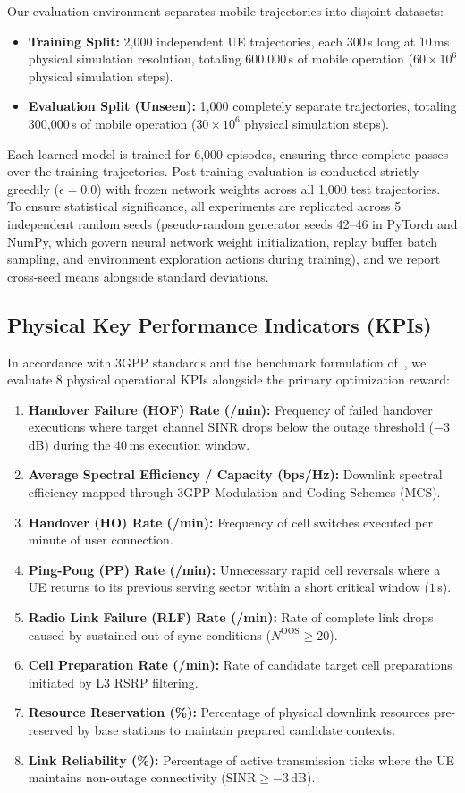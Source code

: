 \documentclass{ieeetmlcn}
\begin{document}
Our evaluation environment separates mobile trajectories into disjoint datasets:
\begin{itemize}
    \item \textbf{Training Split:} 2,000 independent UE trajectories, each 300\,s long at 10\,ms physical simulation resolution, totaling 600,000\,s of mobile operation ($60 \times 10^6$ physical simulation steps).
    \item \textbf{Evaluation Split (Unseen):} 1,000 completely separate trajectories, totaling 300,000\,s of mobile operation ($30 \times 10^6$ physical simulation steps).
\end{itemize}
Each learned model is trained for 6,000 episodes, ensuring three complete passes over the training trajectories. Post-training evaluation is conducted strictly greedily ($\epsilon = 0.0$) with frozen network weights across all 1,000 test trajectories. To ensure statistical significance, all experiments are replicated across 5 independent random seeds (pseudo-random generator seeds 42--46 in PyTorch and NumPy, which govern neural network weight initialization, replay buffer batch sampling, and environment exploration actions during training), and we report cross-seed means alongside standard deviations.

\subsection{Physical Key Performance Indicators (KPIs)}
In accordance with 3GPP standards and the benchmark formulation of~\cite{cmab_ho}, we evaluate 8 physical operational KPIs alongside the primary optimization reward:
\begin{enumerate}
    \item \textbf{Handover Failure (HOF) Rate (/min):} Frequency of failed handover executions where target channel SINR drops below the outage threshold ($-3$\,dB) during the 40\,ms execution window.
    \item \textbf{Average Spectral Efficiency / Capacity (bps/Hz):} Downlink spectral efficiency mapped through 3GPP Modulation and Coding Schemes (MCS).
    \item \textbf{Handover (HO) Rate (/min):} Frequency of cell switches executed per minute of user connection.
    \item \textbf{Ping-Pong (PP) Rate (/min):} Unnecessary rapid cell reversals where a UE returns to its previous serving sector within a short critical window ($1$\,s).
    \item \textbf{Radio Link Failure (RLF) Rate (/min):} Rate of complete link drops caused by sustained out-of-sync conditions ($N^{\text{OOS}} \ge 20$).
    \item \textbf{Cell Preparation Rate (/min):} Rate of candidate target cell preparations initiated by L3 RSRP filtering.
    \item \textbf{Resource Reservation (\%):} Percentage of physical downlink resources pre-reserved by base stations to maintain prepared candidate contexts.
    \item \textbf{Link Reliability (\%):} Percentage of active transmission ticks where the UE maintains non-outage connectivity ($\text{SINR} \ge -3$\,dB).
\end{enumerate}
\end{document}

